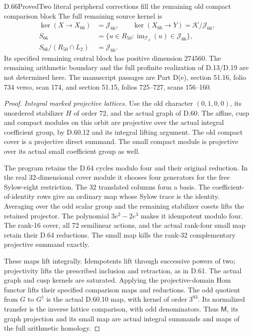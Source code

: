 \begin{statement}{D.66}{Proved}{Two literal peripheral corrections fill the remaining old compact comparison block}
The full remaining source kernel is
\[
 \begin{aligned}
 \ker(X\to X_{66})&=\mathcal J_{66},\qquad
 \ker(X_{66}\to Y)=\mathcal K/\mathcal J_{66},\\
 S_{66}&=\{u\in R_{50}:
         \operatorname{im}_{\mathcal T_2}(u)\in\mathcal J_{66}\},\\
 S_{66}/(R_{50}\cap L_2)&=\mathcal J_{66}.
 \end{aligned}
 \tag{D.66.8}
\]
Its specified remaining central block has positive dimension
\(274560\). The remaining arithmetic boundary and the full
profinite realization of D.13/D.19 are not determined here.
The manuscript passages are Part D(e), section 51.16, folio 734
verso, scan 174, and section 51.15, folios 725--727, scans 156--160.
\end{statement}
\begin{proof}
\emph{Integral marked projective lattices.}
Use the old character \((0,1,0,0)\), its unordered stabilizer
\(H\) of order 72, and the actual graph of D.60. The affine,
cusp and compact modules on this orbit are projective over
the actual integral coefficient group, by D.60.12 and its
integral lifting argument. The old compact cover is a
projective direct summand. The small compact module is
projective over its actual small coefficient group as well.

The program  retains the D.64
cycles modulo four and their original reduction. In the real
32-dimensional cover module it chooses four generators for
the free Sylow-eight restriction. The 32 translated columns
form a basis. The coefficient-of-identity rows give an
ordinary map whose Sylow trace is the identity. Averaging
over the odd scalar group and the remaining stabilizer
cosets lifts the retained projector. The polynomial
\(3e^2-2e^3\) makes it idempotent modulo four. The rank-16
cover, all 72 semilinear actions, and the actual rank-four
small map retain their D.64 reductions. The small map kills
the rank-32 complementary projective summand exactly.

These maps lift integrally. Idempotents lift through
successive powers of two; projectivity lifts the prescribed
inclusion and retraction, as in D.61. The actual graph and
cusp kernels are saturated. Applying the projective-domain
Hom functor lifts their specified comparison maps and
reductions. The odd quotient from \(G\) to \(G^\dagger\)
is the actual D.60.10 map, with kernel of order \(3^{93}\).
Its normalized transfer is the inverse lattice comparison,
with odd denominators. Thus \(\mathsf M\), its graph
projection and its small map are actual integral summands
and maps of the full arithmetic homology.


\end{proof}
